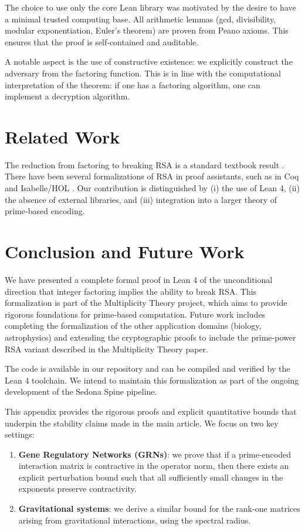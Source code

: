 \documentclass[12pt,a4paper]{article}
\begin{document}
The choice to use only the core Lean library was motivated by the desire to have a minimal trusted computing base. All arithmetic lemmas (gcd, divisibility, modular exponentiation, Euler's theorem) are proven from Peano axioms. This ensures that the proof is self‐contained and auditable.

A notable aspect is the use of constructive existence: we explicitly construct the adversary from the factoring function. This is in line with the computational interpretation of the theorem: if one has a factoring algorithm, one can implement a decryption algorithm.

\section{Related Work}

The reduction from factoring to breaking RSA is a standard textbook result \cite{KatzLindell}. There have been several formalizations of RSA in proof assistants, such as in Coq \cite{CoqRSA} and Isabelle/HOL \cite{IsabelleRSA}. Our contribution is distinguished by (i) the use of Lean 4, (ii) the absence of external libraries, and (iii) integration into a larger theory of prime‐based encoding.

\section{Conclusion and Future Work}

We have presented a complete formal proof in Lean 4 of the unconditional direction that integer factoring implies the ability to break RSA. This formalization is part of the Multiplicity Theory project, which aims to provide rigorous foundations for prime‐based computation. Future work includes completing the formalization of the other application domains (biology, astrophysics) and extending the cryptographic proofs to include the prime‐power RSA variant described in the Multiplicity Theory paper.

The code is available in our repository and can be compiled and verified by the Lean 4 toolchain. We intend to maintain this formalization as part of the ongoing development of the Sedona Spine pipeline.

\appendix
This appendix provides the rigorous proofs and explicit quantitative bounds that underpin the stability claims made in the main article. We focus on two key settings: 
\begin{enumerate}
\item \textbf{Gene Regulatory Networks (GRNs)}: we prove that if a prime‐encoded interaction matrix is contractive in the operator norm, then there exists an explicit perturbation bound such that all sufficiently small changes in the exponents preserve contractivity.
\item \textbf{Gravitational systems}: we derive a similar bound for the rank‐one matrices arising from gravitational interactions, using the spectral radius.
\end{enumerate}
\end{document}
